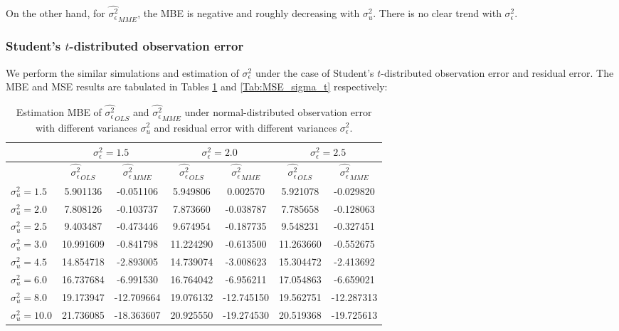 \documentclass{article}
\begin{document}
On the other hand, for $\hat{\sigma^2_\epsilon}_{MME}$, the MBE is negative and roughly decreasing with $\sigma^2_u$. There is no clear trend with $\sigma^2_\epsilon$. 


\subsubsection{Student's $t$-distributed observation error}

We perform the similar simulations and estimation of $\sigma^2_\epsilon$ under the case of Student's $t$-distributed observation error and residual error.
The MBE and MSE results are tabulated in Tables \ref{Tab:MBE_sigma_t} and \ref{Tab:MSE_sigma_t} respectively:

\begin{table}[ht]
    \centering
    \caption{Estimation MBE of $\hat{\sigma^2_\epsilon}_{OLS}$ and $\hat{\sigma^2_\epsilon}_{MME}$ under normal-distributed observation error with different variances $\sigma^2_u$ and residual error with different variances $\sigma^2_\epsilon$.}
    \label{Tab:MBE_sigma_t}
    \begin{tabular}[t]{lcccccc}
        \hline
        &\multicolumn{2}{c}{$\sigma^2_\epsilon=1.5$}&\multicolumn{2}{c}{$\sigma^2_\epsilon=2.0$}&\multicolumn{2}{c}{$\sigma^2_\epsilon=2.5$}\\
        \hline
        &$\hat{\sigma^2_\epsilon}_{OLS}$&$\hat{\sigma^2_\epsilon}_{MME}$&$\hat{\sigma^2_\epsilon}_{OLS}$&
        $\hat{\sigma^2_\epsilon}_{MME}$&$\hat{\sigma^2_\epsilon}_{OLS}$&$\hat{\sigma^2_\epsilon}_{MME}$\\
        \hline
        $\sigma^2_u = 1.5$&5.901136&-0.051106&5.949806&0.002570&5.921078&-0.029820\\
        $\sigma^2_u = 2.0$&7.808126&-0.103737&7.873660&-0.038787&7.785658&-0.128063\\
        $\sigma^2_u = 2.5$&9.403487&-0.473446&9.674954&-0.187735&9.548231&-0.327451\\
        $\sigma^2_u = 3.0$&10.991609&-0.841798&11.224290&-0.613500&11.263660&-0.552675\\
        $\sigma^2_u = 4.5$&14.854718&-2.893005&14.739074&-3.008623&15.304472&-2.413692\\
        $\sigma^2_u = 6.0$&16.737684&-6.991530&16.764042&-6.956211&17.054863&-6.659021\\
        $\sigma^2_u = 8.0$&19.173947&-12.709664&19.076132&-12.745150&19.562751&-12.287313\\
        $\sigma^2_u = 10.0$&21.736085&-18.363607&20.925550&-19.274530&20.519368&-19.725613\\ 
        \hline
    \end{tabular}
\end{table}
\end{document}
